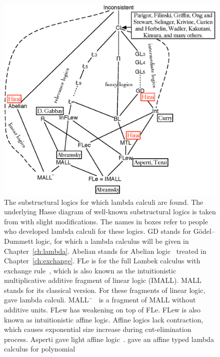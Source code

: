  \begin{figure}
  \centering
  \includegraphics[scale=0.8]{lattice.eps}
  \caption[The lattice of substructural logics, some of which with known lambda calculi.]
  {\small
  The substructural logics for which lambda calculi are found.
  The underlying Hasse diagram of well-known substructural logics is
  taken from
  \cite[p.~120]{residuated} with slight modifications.
  The names in boxes refer to people who developed lambda calculi for
  these logics.{
  \textsf{GD} stands for G\"odel--Dummett logic, for which
  a lambda calculus will be given in
  Chapter~\ref{ch:lambda}.
  \textsf{Abelian} stands for Abelian
  logic~\citep{meyer-slaney-1989,casari1989,metcalfe2002}
  treated in Chapter~\ref{ch:exchange}.
  \textsf{FLe} is for the full Lambek calculus with exchange
  rule~\citep[p.86]{residuated}, which is also known as the
  intuitionistic
  multiplicative additive fragment of linear logic (\textsf{IMALL}).
  \textsf{MALL} stands for its classical version.  For these fragments of linear
  logic,
  \citet{abramsky1993computational} gave lambda calculi.
  \textsf{MALL}$^-$~\citep{girard1987}
  is a fragment of \textsf{MALL} without additive
  units.
  \textsf{FLew} has weakening on top of \textsf{FLe}.
  \textsf{FLew} is also known as intuitionistic affine logic.
  Affine logics lack contraction, which causes exponential size increase
  during cut-elimination process.
  Asperti gave light affine logic~\citep{asperti2002}.
  \citet{terui2007} gave an affine typed lambda calculus for polynomial
}}
\end{figure}
